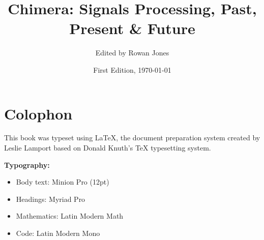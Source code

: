 \documentclass[11pt,oneside]{book}
\title{Chimera: Signals Processing, Past, Present \& Future}
\author{Edited by Rowan Jones}
\date{First Edition, \today}
\begin{document}
\frontmatter

\begin{titlepage}
\thispagestyle{empty}

\end{titlepage}









\tableofcontents
\clearpage



\mainmatter













\backmatter

\backmatter

\printbibliography[heading=bibintoc,title={Bibliography}]



\printindex

\chapter*{Colophon}

This book was typeset using \LaTeX{}, the document preparation system created by Leslie Lamport based on Donald Knuth's \TeX{} typesetting system.

\textbf{Typography:}
\begin{itemize}
\item Body text: Minion Pro (12pt)
\item Headings: Myriad Pro
\item Mathematics: Latin Modern Math
\item Code: Latin Modern Mono
\end{itemize}
\end{document}
